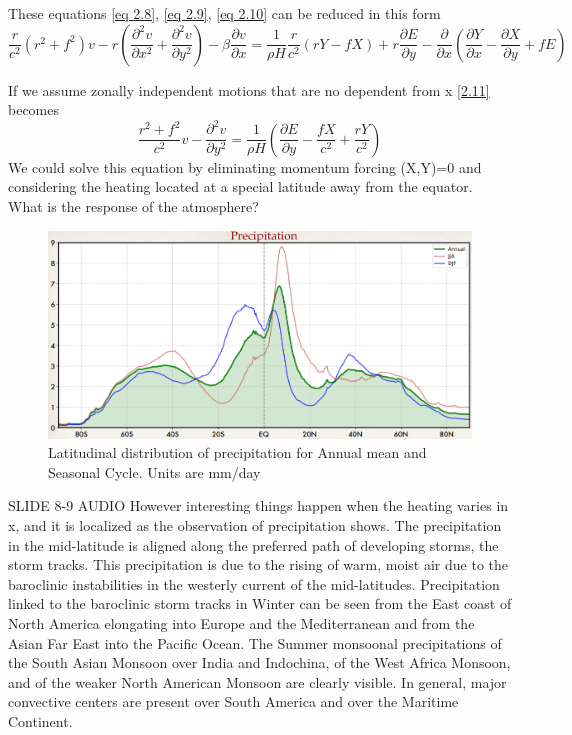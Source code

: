 These equations \ref{eq 2.8}, \ref{eq 2.9}, \ref{eq 2.10} can be reduced in this form
\begin{equation}\label{2.11}
	\frac{r}{c^2} \left( r^2 + f^2 \right) v - r \left( \frac{\partial^2 v}{\partial x^2} + \frac{\partial^2 v}{\partial y^2} \right) - \beta \frac{\partial v}{\partial x}
	= \frac{1}{\rho H} \frac{r}{c^2} \left( rY - fX \right) + r \frac{\partial E}{\partial y} - \frac{\partial}{\partial x} \left( \frac{\partial Y}{\partial x} - \frac{\partial X}{\partial y} + fE \right)
\end{equation}

If we assume zonally independent motions that are no dependent from x \ref{2.11} becomes
\begin{equation}
	\frac{r^2 + f^2}{c^2} v - \frac{\partial^2 v}{\partial y^2} = \frac{1}{\rho H} \left( \frac{\partial E}{\partial y} - \frac{fX}{c^2} + \frac{rY}{c^2} \right)
\end{equation}
We could solve this equation by eliminating momentum forcing (X,Y)=0 and considering the heating located at a special latitude away from the equator.\\[0.5 cm]

What is the response of the atmosphere?
\begin{figure}[htpb]
	\centering
	\includegraphics[width=0.5\linewidth]{uploads/precipit.png}
	\caption{Latitudinal distribution of precipitation for Annual
		mean and Seasonal Cycle. Units are mm/day}
	\label{fig:enter-label}
\end{figure}
SLIDE 8-9 AUDIO
However interesting things happen when the heating varies in x, and it is localized as the observation of precipitation shows. The precipitation in the mid-latitude is aligned along the preferred path of developing storms, the storm tracks. This precipitation is due to the rising of warm, moist air due to the baroclinic instabilities in the westerly current of the mid-latitudes. Precipitation linked to the baroclinic storm tracks in Winter can be seen from the East coast of North America elongating into Europe and the Mediterranean and from the Asian Far East into the Pacific Ocean. The Summer monsoonal precipitations of the South Asian Monsoon over India and Indochina, of the West Africa Monsoon, and of the weaker North American Monsoon are clearly visible. In general, major convective centers are present over South America and over the Maritime Continent.


